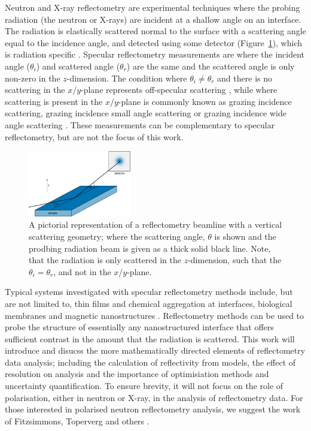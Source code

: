 \documentclass[
 reprint,
 superscriptaddress,
 amsmath,amssymb,
 aps,
]{revtex4-1}
\begin{document}
Neutron and X-ray reflectometry are experimental techniques where the probing radiation (the neutron or X-rays) are incident at a shallow angle on an interface. 
The radiation is elastically scattered normal to the surface with a scattering angle equal to the incidence angle, and detected using some detector (Figure~\ref{fig:beamline}), which is radiation specific \cite{pietropaolo_neutron_2020,looker_synchrotron_2020}.
Specular reflectometry measurements are where the incident angle ($\theta_i$) and scattered angle ($\theta_r$) are the same and the scattered angle is only non-zero in the $z$-dimension. 
The condition where $\theta_i \neq \theta_r$ and there is no scattering in the $x/y$-plane represents off-specular scattering \cite{richardson_study_1997,dai_comparative_2011}, while where scattering is present in the $x/y$-plane is commonly known as grazing incidence scattering, grazing incidence small angle scattering or grazing incidence wide angle scattering \cite{renaud_probing_2009,smilgies_scherrer_2009,hexemer_advanced_2015}. 
These measurements can be complementary to specular reflectometry, but are not the focus of this work. 
%
\begin{figure}[t]
    \includegraphics[width=0.4\textwidth]{beamline}
    \caption{A pictorial representation of a reflectometry beamline with a vertical scattering geometry; where the scattering angle, $\theta$ is shown and the prodbing radiation beam is given as a thick solid black line. Note, that the radiation is only scattered in the $z$-dimension, such that the $\theta_i=\theta_r$, and not in the $x/y$-plane.}
    \label{fig:beamline}
\end{figure}
%

Typical systems investigated with specular reflectometry methods include, but are not limited to, thin films \cite{delcea_xray_2019} and chemical aggregation \cite{ma_unusual_2021} at interfaces, biological membranes \cite{john_large_2021} and magnetic nanostructures \cite{liu_coherent_2020}.
Reflectometry methods can be used to probe the structure of essentially any nanostructured interface that offers sufficient contrast in the amount that the radiation is scattered. 
This work will introduce and disucss the more mathematically directed elements of reflectometry data analysis; including the calculation of reflectivity from models, the effect of resolution on analysis and the importance of optimisiation methods and uncertainty quantification.
To ensure brevity, it will not focus on the role of polarisation, either in neutron or X-ray, in the analysis of reflectometry data. 
For those interested in polarised neutron reflectometry analysis, we suggest the work of Fitzsimmons, Toperverg and others \cite{fitzsimmons_applications_2005,zabel_polarized_2007,toperberg_neutron_2015}.
\end{document}
